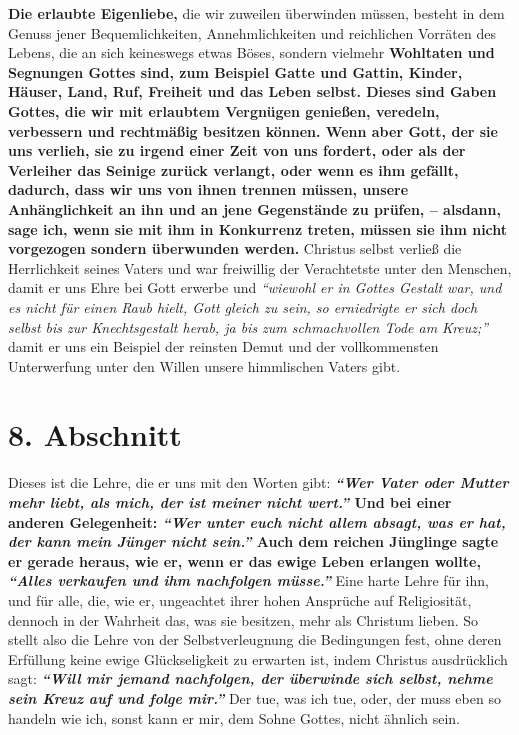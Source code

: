 \label{ref:04_07_vorteile}
\textbf{Die erlaubte Eigenliebe,} die wir zuweilen
überwinden müssen,
besteht in dem
Genuss jener Bequemlichkeiten, Annehmlichkeiten und reichlichen Vorräten des
Lebens, die an sich keineswegs etwas Böses, sondern vielmehr \textbf{Wohltaten
und
Segnungen Gottes sind, zum Beispiel Gatte und Gattin, Kinder, Häuser, Land, Ruf,
Freiheit und das Leben selbst. Dieses sind Gaben Gottes, die wir mit erlaubtem
Vergnügen genießen, veredeln, verbessern und rechtmäßig besitzen können. Wenn
aber Gott, der sie uns verlieh, sie zu irgend einer Zeit von uns fordert, oder
als der Verleiher das Seinige zurück verlangt, oder wenn es ihm gefällt,
dadurch, dass wir uns von ihnen trennen müssen, unsere Anhänglichkeit an ihn und
an jene Gegenstände zu prüfen, -- alsdann, sage ich, wenn sie mit ihm in
Konkurrenz treten,
müssen
sie ihm nicht vorgezogen sondern überwunden werden.}
Christus selbst verließ die Herrlichkeit seines Vaters und war freiwillig der
Verachtetste unter den Menschen, damit er uns Ehre bei Gott erwerbe und
\textit{"`wiewohl er in Gottes Gestalt war, und es nicht für einen Raub hielt,
Gott
gleich zu sein, so erniedrigte er sich doch selbst bis zur Knechtsgestalt
herab, ja bis zum schmachvollen Tode am Kreuz;"'}
damit er
uns ein Beispiel der reinsten Demut und der vollkommensten Unterwerfung unter
den Willen unsere himmlischen Vaters gibt.

\section{8. Abschnitt} \label{kap4_ab8}

Dieses ist die Lehre, die er uns mit den Worten gibt:
\textbf{
\textit{"`Wer Vater oder Mutter mehr liebt, als mich, der ist meiner nicht
wert."'}
Und bei einer anderen Gelegenheit:
\textit{"`Wer unter euch nicht allem absagt, was er hat, der kann mein Jünger
nicht sein."'} Auch dem reichen
Jünglinge sagte er gerade heraus, wie er, wenn er das ewige Leben erlangen
wollte,
\textit{"`Alles verkaufen und ihm nachfolgen müsse."'}
}
Eine harte Lehre für ihn, und für alle, die, wie er, ungeachtet ihrer hohen
Ansprüche auf Religiosität, dennoch in der Wahrheit das, was sie besitzen, mehr
als Christum lieben. So stellt also die Lehre von der Selbstverleugnung die
Bedingungen fest, ohne deren Erfüllung keine ewige Glückseligkeit zu erwarten
ist, indem Christus ausdrücklich sagt:
\textbf{
\textit{"`Will mir jemand nachfolgen, der überwinde sich selbst, nehme sein Kreuz auf und folge
mir."'}}
Der tue, was ich tue, oder, der muss eben so handeln wie ich, sonst kann
er mir, dem Sohne Gottes, nicht ähnlich sein.

